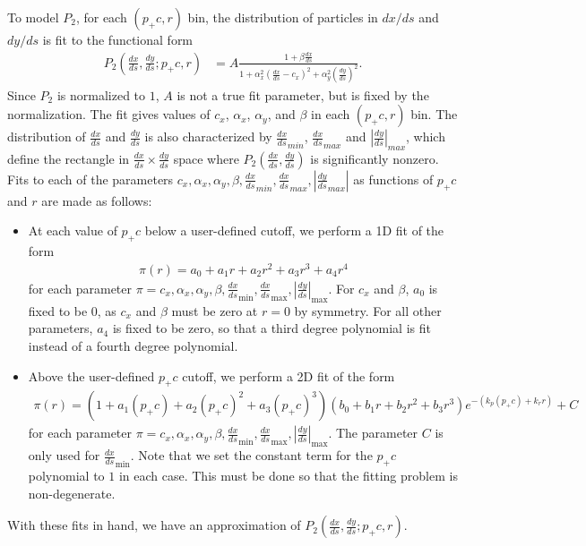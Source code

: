 \documentclass[12pt]{article}
\newcommand{\dxds}{\frac{dx}{ds}}
\newcommand{\dyds}{\frac{dy}{ds}}
\newcommand{\dxdsmin}{\dxds_{\mathrm{min}}}
\newcommand{\dxdsmax}{\dxds_{\mathrm{max}}}
\newcommand{\dydsmax}{\left| \dyds \right|_{\mathrm{max}}}
\begin{document}
To model $P_2$, for each $(p_+ c, r)$ bin, the distribution of particles in $dx/ds$ and $dy/ds$ is
fit to the functional form
\begin{align}
P_2 \left( \dxds, \dyds; p_+ c, r \right) & = A \frac{1 + \beta \dxds}{1 + \alpha_x^2 \left( \dxds - c_x \right)^2 + \alpha_y^2 \left( \dyds \right)^2}. \label{eq:cauchy}
\end{align}
Since $P_2$ is normalized to $1$, $A$ is not a true fit parameter, but is fixed by the
normalization.  The fit gives values of $c_x$, $\alpha_x$, $\alpha_y$, and $\beta$ in each $(p_+ c,
r)$ bin.  The distribution of $\dxds$ and $\dyds$ is also characterized by $\dxds_{min}$,
$\dxds_{max}$ and $\left| \dyds \right|_{max}$, which define the rectangle in $\dxds \times \dyds$
space where $P_2 \left( \dxds, \dyds \right)$ is significantly nonzero.  Fits to each of the
parameters $c_x, \alpha_x, \alpha_y, \beta, \dxds_{min}, \dxds_{max}, \left| \dyds_{max} \right|$ as
functions of $p_+ c$ and $r$ are made as follows:
\begin{itemize}
\item
At each value of $p_+ c$ below a user-defined cutoff, we perform a 1D fit of the form
\begin{align}
\pi(r) = a_0 + a_1 r+ a_2 r^2 + a_3 r^3 + a_4 r^4 \label{eq:fit1}
\end{align}
for each parameter $\pi =c_x, \alpha_x, \alpha_y, \beta, \dxdsmin, \dxdsmax, \dydsmax$.  For $c_x$
and $\beta$, $a_0$ is fixed to be 0, as $c_x$ and $\beta$ must be zero at $r=0$ by symmetry.  For
all other parameters, $a_4$ is fixed to be zero, so that a third degree polynomial is fit instead of
a fourth degree polynomial.

\item
Above the user-defined $p_+ c$ cutoff, we perform a 2D fit of the form
\begin{align}
\pi(r) = (1 + a_1 (p_+c) + a_2 (p_+c)^2 + a_3 (p_+c)^3)
         (b_0 + b_1 r + b_2 r^2 + b_3 r^3) e^{-(k_p (p_+ c) + k_r r)} + C \label{eq:fit2}
\end{align}
for each parameter $\pi =c_x, \alpha_x, \alpha_y, \beta, \dxdsmin, \dxdsmax, \dydsmax$.  The
parameter $C$ is only used for $\dxdsmin$.  Note that we set the constant term for the $p_+ c$
polynomial to $1$ in each case.  This must be done so that the fitting problem is non-degenerate.

\end{itemize}
With these fits in hand, we have an approximation of $P_2 \left( \dxds, \dyds; p_+ c, r \right)$.
\end{document}
